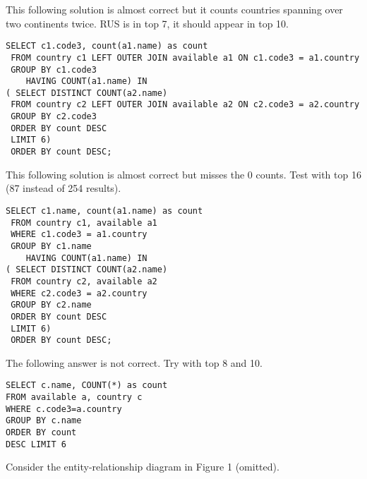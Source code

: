\documentclass[10pt,a4paper,answers]{exam}
\begin{document}
\begin{questions}
\begin{parts}
\begin{solution}
This following solution is almost correct but it counts countries spanning over two continents twice. RUS is in top 7, it should appear in top 10. 
\begin{lstlisting}
SELECT c1.code3, count(a1.name) as count
 FROM country c1 LEFT OUTER JOIN available a1 ON c1.code3 = a1.country
 GROUP BY c1.code3
 	HAVING COUNT(a1.name) IN
( SELECT DISTINCT COUNT(a2.name) 
 FROM country c2 LEFT OUTER JOIN available a2 ON c2.code3 = a2.country
 GROUP BY c2.code3
 ORDER BY count DESC
 LIMIT 6)
 ORDER BY count DESC;
\end{lstlisting}
This following solution is almost correct but misses the 0 counts. Test with top 16 (87 instead of 254 results).
\begin{lstlisting}
SELECT c1.name, count(a1.name) as count
 FROM country c1, available a1
 WHERE c1.code3 = a1.country
 GROUP BY c1.name
 	HAVING COUNT(a1.name) IN
( SELECT DISTINCT COUNT(a2.name) 
 FROM country c2, available a2 
 WHERE c2.code3 = a2.country
 GROUP BY c2.name
 ORDER BY count DESC
 LIMIT 6)
 ORDER BY count DESC;
\end{lstlisting}

The following answer is not correct. Try with top 8 and 10.
\begin{lstlisting}
SELECT c.name, COUNT(*) as count 
FROM available a, country c
WHERE c.code3=a.country
GROUP BY c.name
ORDER BY count 
DESC LIMIT 6
\end{lstlisting}
\end{solution}
\end{parts}


\pagebreak
\question\label{ques:er} Consider the  entity-relationship diagram in Figure 1 (omitted).

\end{questions}
\end{document}
